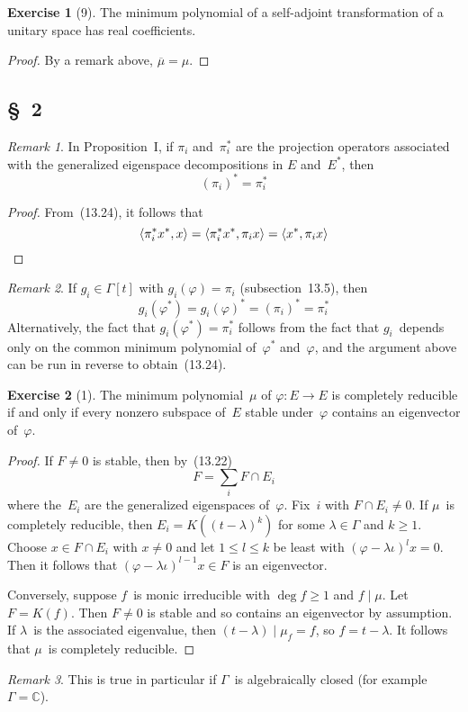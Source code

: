 \documentclass[letterpaper,12pt]{article}
\newcommand{\C}{\mathbb{C}}
\newcommand{\divides}{\mid}
\newcommand{\sect}{\cap}
\newcommand{\sprod}[2]{\langle#1,#2\rangle}
\newcommand{\conj}[1]{\overline{#1}}
\theoremstyle{definition}
\newtheorem*{exer}{Exercise}
\theoremstyle{remark}
\newtheorem*{rmk}{Remark}
\begin{document}
\begin{exer}[9]
The minimum polynomial of a self-adjoint transformation of a unitary space has real coefficients.
\end{exer}
\begin{proof}
By a remark above, \(\conj{\mu}=\mu\).
\end{proof}

\subsection*{\S~2}
\begin{rmk}
In Proposition~I, if \(\pi_i\) and~\(\pi^*_i\) are the projection operators associated with the generalized eigenspace decompositions in \(E\) and~\(E^*\), then
\[(\pi_i)^*=\pi^*_i\]
\end{rmk}
\begin{proof}
From~(13.24), it follows that
\[\sprod{\pi^*_i x^*}{x}=\sprod{\pi^*_i x^*}{\pi_i x}=\sprod{x^*}{\pi_i x}\qedhere\]
\end{proof}
\begin{rmk}
If \(g_i\in\Gamma[t]\) with \(g_i(\varphi)=\pi_i\) (subsection~13.5), then
\[g_i(\varphi^*)=g_i(\varphi)^*=(\pi_i)^*=\pi^*_i\]
Alternatively, the fact that \(g_i(\varphi^*)=\pi^*_i\) follows from the fact that \(g_i\)~depends only on the common minimum polynomial of~\(\varphi^*\) and~\(\varphi\), and the argument above can be run in reverse to obtain~(13.24).
\end{rmk}

\begin{exer}[1]
The minimum polynomial~\(\mu\) of \(\varphi:E\to E\) is completely reducible if and only if every nonzero subspace of~\(E\) stable under~\(\varphi\) contains an eigenvector of~\(\varphi\).
\end{exer}
\begin{proof}
If \(F\ne 0\) is stable, then by~(13.22)
\[F=\sum_i F\sect E_i\]
where the~\(E_i\) are the generalized eigenspaces of~\(\varphi\). Fix~\(i\) with \(F\sect E_i\ne 0\). If \(\mu\)~is completely reducible, then \(E_i=K((t-\lambda)^k)\) for some \(\lambda\in\Gamma\) and \(k\ge 1\). Choose \(x\in F\sect E_i\) with \(x\ne 0\) and let \(1\le l\le k\) be least with \((\varphi-\lambda\iota)^l x=0\). Then it follows that \((\varphi-\lambda\iota)^{l-1}x\in F\) is an eigenvector.

Conversely, suppose \(f\)~is monic irreducible with \(\deg f\ge 1\) and \(f\divides\mu\). Let \(F=K(f)\). Then \(F\ne 0\) is stable and so contains an eigenvector by assumption. If \(\lambda\)~is the associated eigenvalue, then \((t-\lambda)\divides\mu_f=f\), so \(f=t-\lambda\). It follows that \(\mu\)~is completely reducible.
\end{proof}
\begin{rmk}
This is true in particular if \(\Gamma\)~is algebraically closed (for example \(\Gamma=\C\)).
\end{rmk}
\end{document}
